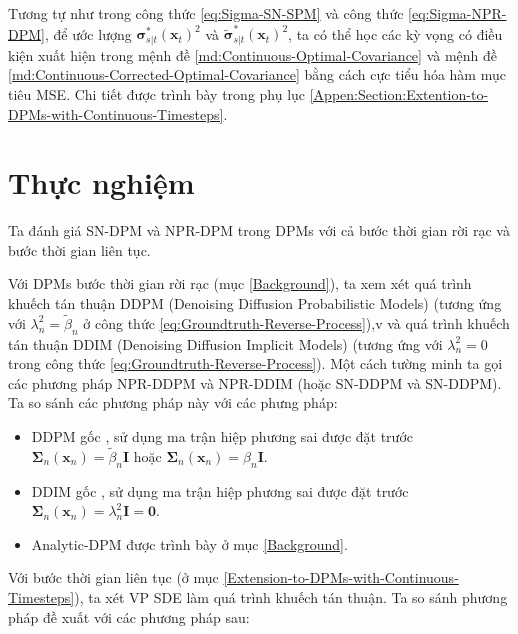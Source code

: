 \documentclass[14pt, a4paper]{article}
\numberwithin{equation}{section}
\numberwithin{figure}{section}
\numberwithin{dl}{section}
\numberwithin{md}{section}
\numberwithin{bd}{section}
\numberwithin{dn}{section}
\numberwithin{hq}{section}
\begin{document}
    Tương tự như trong công thức \ref{eq:Sigma-SN-SPM} và công thức \ref{eq:Sigma-NPR-DPM},
    để ước lượng $\boldsymbol{\sigma}_{s \vert t}^{\ast} (\boldsymbol{x}_t)^2$ và $\tilde{\boldsymbol{\sigma}}_{s \vert t}^{\ast} (\boldsymbol{x}_t)^2$,
    ta có thể học các kỳ vọng có điều kiện xuất hiện trong mệnh đề \ref{md:Continuous-Optimal-Covariance} và mệnh đề \ref{md:Continuous-Corrected-Optimal-Covariance} bằng cách cực tiểu hóa hàm mục tiêu MSE.
    Chi tiết được trình bày trong phụ lục \ref{Appen:Section:Extention-to-DPMs-with-Continuous-Timesteps}.

    \section{Thực nghiệm}

    Ta đánh giá SN-DPM và NPR-DPM trong DPMs với cả bước thời gian rời rạc và bước thời gian liên tục.

    Với DPMs bước thời gian rời rạc (mục \ref{Background}), ta xem xét quá trình khuếch tán thuận DDPM (Denoising Diffusion Probabilistic Models) (tương ứng với $\lambda_n^2 = \tilde{\beta}_n$ ở công thức \ref{eq:Groundtruth-Reverse-Process}),v
    và quá trình khuếch tán thuận DDIM (Denoising Diffusion Implicit Models) (tương ứng với $\lambda_n^2 = 0$ trong công thức \ref{eq:Groundtruth-Reverse-Process}).
    Một cách tường minh ta gọi các phương pháp NPR-DDPM và NPR-DDIM (hoặc SN-DDPM và SN-DDPM). Ta so sánh các phương pháp này với các phưng pháp:

    \begin{itemize}
        \item DDPM gốc \cite{ho2020denoising}, sử dụng ma trận hiệp phương sai được đặt trước $\boldsymbol{\Sigma}_n (\boldsymbol{x}_n)=\tilde{\beta}_n \boldsymbol{I}$ hoặc $\boldsymbol{\Sigma}_n (\boldsymbol{x}_n) = \beta_n \boldsymbol{I}$.
        \item DDIM gốc \cite{song2020denoising}, sử dụng ma trận hiệp phương sai được đặt trước $\boldsymbol{\Sigma}_n (\boldsymbol{x}_n) = \lambda_n^2 \boldsymbol{I} = \boldsymbol{0}$.
        \item Analytic-DPM \cite{bao2021analytic} được trình bày ở mục \ref{Background}.
    \end{itemize}

    Với bước thời gian liên tục (ở mục \ref{Extension-to-DPMs-with-Continuous-Timesteps}), ta xét VP SDE \cite{song2020score} làm quá trình khuếch tán thuận.
    Ta so sánh phương pháp đề xuất với các phương pháp sau:
\end{document}

